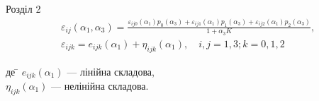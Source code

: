 \documentclass[8pt]{beamer}
\numberwithin{figure}{section}
\numberwithin{equation}{section}
\begin{document}
\begin{frame}{Розділ 2}
\begin{equation}
\begin{aligned}
&\varepsilon_{ij} \left( \alpha_1, \alpha_3 \right) = \frac{\varepsilon_{ij0} \left( \alpha_1\right)p_0 \left( \alpha_3\right)+\varepsilon_{ij1} \left( \alpha_1\right)p_1 \left( \alpha_3\right)+\varepsilon_{ij2} \left( \alpha_1\right)p_2 \left( \alpha_3\right)}{1+\alpha_3 K},\\
&\varepsilon_{ijk} = e_{ijk}\left( \alpha_1\right)+\eta_{ijk}\left( \alpha_1\right), \quad i,j=1,3; k=0,1,2
\end{aligned}
\end{equation}

\begin{tabbing}
де \= $e_{ijk}\left( \alpha_1\right)$ --- лінійна складова,\\
\> $\eta_{ijk}\left( \alpha_1\right)$ --- нелінійна складова.
\end{tabbing}



\end{frame}
\end{document}
